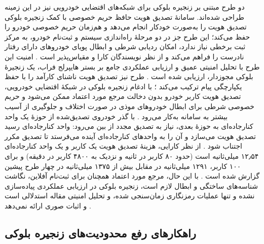 \documentclass[12pt,a4paper]{article}
\begin{document}
دو طرح مبتنی بر زنجیره بلوکی برای شبکه‌های اقتضایی خودرویی نیز در این زمینه طراحی شده‌اند. سامانهٔ تصدیق هویت حافظ حریم خصوصی با کمک زنجیره بلوکی تصدیق هویت را به‌صورت خودکار انجام می‌دهد و هم‌زمان حریم خصوصی خودرو را حفظ می‌کند؛ این طرح جز در دو مرحلهٔ راه‌اندازی سیستم و ثبت‌نام خودرو، به مرکز ثبت برخطی نیاز ندارد، امکان ردیابی شرطی و ابطال پویای خودرو‌های دارای رفتار نادرست را فراهم می‌کند و از نظر نویسندگان کارا و مقیاس‌پذیر است \cite{fengBPASBlockchainAssistedPrivacyPreserving2020}. امنیت این طرح با تحلیل امنیتی عمیق و ارزیابی عملکردی جامع بر بستر هایپرلج فراب، یک زنجیرهٔ بلوکی مجوزدار، ارزیابی شده است \cite{fengBPASBlockchainAssistedPrivacyPreserving2020}. طرح  نیز تصدیق هویت ناشنای کارآمد را با حفظ یکپارچگی پیام ترکیب می‌کند \cite{mariaBAIVEfficientBlockchainBased2022}؛ با ادغام زنجیره بلوکی در شبکهٔ اقتضایی خودرویی، تصدیق هویت کاربر خودرو بدون دخالت مرجع مورد اعتماد ممکن می‌شود و حریم خصوصی شرطی برای ابطال خودرو‌های موذی در صورت اختلاف و جلوگیری از آسیب بیشتر به سامانه به‌کار می‌رود \cite{mariaBAIVEfficientBlockchainBased2022}. با گذر خودروی تصدیق‌شده از حوزهٔ یک واحد کنارجاده‌ای به حوزهٔ بعدی، نیاز به تصدیق مجدد از بین می‌رود: واحد کنارجاده‌ای رسید تصدیق هویت می‌سازد و آن را به واحد‌های کنارجاده‌ای آینده می‌فرستد تا تصدیق مکرر اجتناب شود \cite{mariaBAIVEfficientBlockchainBased2022}. از نظر کارایی، هزینهٔ تصدیق هویت یک کاربر و یک واحد کنارجاده‌ای ۱۲٫۵۴ میلی‌ثانیه است (حدود ۸۰ کاربر در ثانیه و نزدیک به ۴۸۰۰ کاربر در دقیقه) و برای ۱۰۰ کاربر، ۱۲۹۱ میلی‌ثانیه در مقابل بیش از ۱۳۷۵ میلی‌ثانیه در چهار طرح پیشین گزارش شده است \cite{mariaBAIVEfficientBlockchainBased2022}. با این حال، مرجع مورد اعتماد همچنان برای ثبت‌نام آفلاین، نگاشت شناسه‌های ساختگی و ابطال لازم است، زنجیره بلوکی در ارزیابی عملکردی پیاده‌سازی نشده و تنها عملیات رمزنگاری زمان‌سنجی شده، و تحلیل امنیتی مقاله استدلالی است و اثبات صوری ارائه نمی‌دهد \cite{mariaBAIVEfficientBlockchainBased2022}.

\subsection{راهکار‌های رفع محدودیت‌های زنجیره بلوکی}
\end{document}
